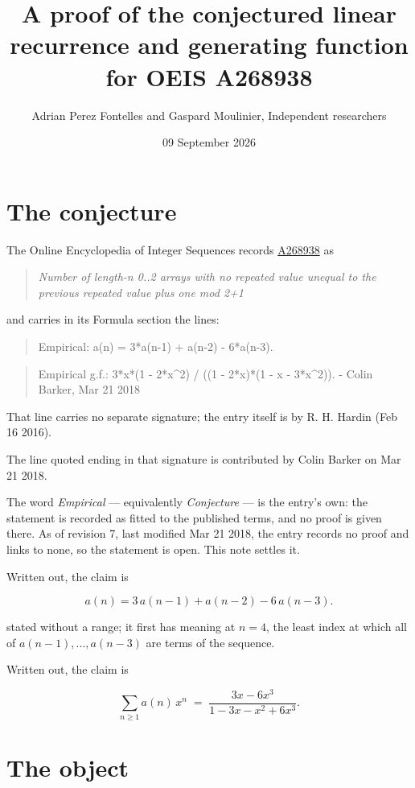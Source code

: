 \documentclass[11pt]{article}
\title{A proof of the conjectured linear recurrence and generating function for OEIS A268938}
\author{Adrian Perez Fontelles and Gaspard Moulinier, Independent researchers}
\date{09 September 2026}
\theoremstyle{definition}
\begin{document}
\maketitle
\section{The conjecture}

The Online Encyclopedia of Integer Sequences records \href{https://oeis.org/A268938}{A268938} as

\begin{quote}\itshape Number of length-n 0..2 arrays with no repeated value unequal to the previous repeated value plus one mod 2+1\end{quote}

and carries in its Formula section the lines:

\begin{quote}\ttfamily Empirical: a(n) = 3*a(n-1) + a(n-2) - 6*a(n-3).\end{quote}

\begin{quote}\ttfamily Empirical g.f.: 3*x*(1 - 2*x\textasciicircum{}2) / ((1 - 2*x)*(1 - x - 3*x\textasciicircum{}2)). - Colin Barker, Mar 21 2018\end{quote}

That line carries no separate signature; the entry itself is by R. H. Hardin (Feb 16 2016).

The line quoted ending in that signature is contributed by Colin Barker on Mar 21 2018.

The word {\itshape Empirical} --- equivalently {\itshape Conjecture} --- is the entry's own: the statement is recorded as fitted to the published terms, and no proof is given there. As of revision 7, last modified Mar 21 2018, the entry records no proof and links to none, so the statement is open. This note settles it.

Written out, the claim is

\[a(n) = 3\,a(n-1) + a(n-2) - 6\,a(n-3).\]

stated without a range; it first has meaning at $n = 4$, the least index at which all of $a(n-1),\dots,a(n-3)$ are terms of the sequence.

Written out, the claim is

\[\sum_{n \ge 1} a(n)\,x^n \;=\; \frac{3x - 6x^{3}}{1 - 3x - x^{2} + 6x^{3}}.\]

\section{The object}
\end{document}
